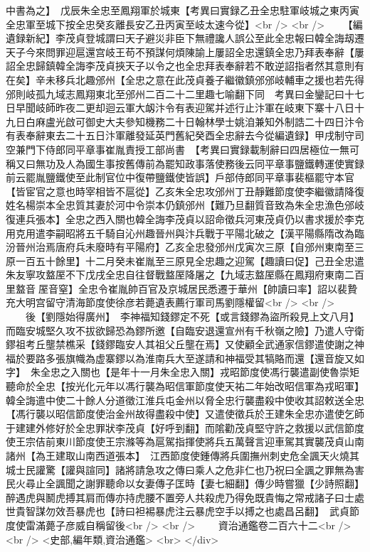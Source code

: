 中書為之】　戊辰朱全忠至鳳翔軍於城東【考異曰實録乙丑全忠駐軍岐城之東丙寅全忠軍至城下按全忠癸亥離長安乙丑丙寅至岐太速今從】<br />
<br />
　　【編遺録新紀】李茂貞登城謂曰天子避災非臣下無禮讒人誤公至此全忠報曰韓全誨刼遷天子今來問罪迎扈還宫岐王苟不預謀何煩陳諭上屢詔全忠還鎮全忠乃拜表奉辭【屢詔全忠歸鎮韓全誨李茂貞挾天子以令之也全忠拜表奉辭若不敢逆詔指者然其意則有在矣】辛未移兵北趣邠州【全忠之意在此茂貞養子繼徽鎮邠邠岐輔車之援也若先得邠則岐孤九域志鳳翔東北至邠州二百二十二里趣七喻翻下同　考異曰金鑾記曰十七日早聞岐師昨夜二更却迴云軍大衂汴令有表迎駕并述行止汴軍在岐東下寨十八日十九日白麻盧光啟可御史大夫參知機務二十日翰林學士姚洎兼知外制誥二十四日汴令有表奉辭東去二十五日汴軍離發延英門舊紀癸酉全忠辭去今從編遺録】甲戌制守司空兼門下侍郎同平章事崔胤責授工部尚書　【考異曰實録載制辭曰四居極位一無可稱又曰無功及人為國生事按舊傳前為罷知政事落使務後云同平章事鹽鐵轉運使實録前云罷胤鹽鐵使至此制官位中復帶鹽鐵使皆誤】戶部侍郎同平章事裴樞罷守本官【皆宦官之意也時宰相皆不扈從】乙亥朱全忠攻邠州丁丑靜難節度使李繼徽請降復姓名楊崇本全忠質其妻於河中令崇本仍鎮邠州【難乃旦翻質音致為朱全忠漁色邠岐復連兵張本】全忠之西入關也韓全誨李茂貞以詔命徵兵河東茂貞仍以書求援於李克用克用遣李嗣昭將五千騎自沁州趣晉州與汴兵戰于平陽北破之【漢平陽縣隋改為臨汾晉州治焉唐府兵未廢時有平陽府】乙亥全忠發邠州戊寅次三原【自邠州東南至三原一百五十餘里】十二月癸未崔胤至三原見全忠趣之迎駕【趣讀曰促】己丑全忠遣朱友寧攻盩厔不下戊戌全忠自往督戰盩厔降屠之【九域志盩厔縣在鳳翔府東南二百里盩音厔音窒】全忠令崔胤帥百官及京城居民悉遷于華州【帥讀曰率】詔以裴贄充大明宫留守清海節度使徐彦若薨遺表薦行軍司馬劉隱權留<br />
<br />
　　後【劉隱始得廣州】　李神福知錢鏐定不死【或言錢鏐為盜所殺見上文八月】而臨安城堅久攻不拔欲歸恐為鏐所邀【自臨安退還宣州有千秋嶺之險】乃遣人守衛鏐祖考丘壟禁樵采【錢鏐臨安人其祖父丘壟在焉】又使顧全武通家信鏐遣使謝之神福於要路多張旗幟為虚寨鏐以為淮南兵大至遂請和神福受其犒賂而還【還音旋又如字】　朱全忠之入關也【是年十一月朱全忠入關】戎昭節度使馮行襲遣副使魯崇矩聽命於全忠【按光化元年以馮行襲為昭信軍節度使天祐二年始改昭信軍為戎昭軍】韓全誨遣中使二十餘人分道徵江淮兵屯金州以脅全忠行襲盡殺中使收其詔敕送全忠【馮行襲以昭信節度使治金州故得盡殺中使】又遣使徵兵於王建朱全忠亦遣使乞師于建建外修好於全忠罪狀李茂貞【好呼到翻】而隂勸茂貞堅守許之救援以武信節度使王宗佶前東川節度使王宗滌等為扈駕指揮使將兵五萬聲言迎車駕其實襲茂貞山南諸州【為王建取山南西道張本】　江西節度使鍾傳將兵圍撫州刺史危全諷天火燒其城士民讙驚【讙與諠同】諸將請急攻之傳曰乘人之危非仁也乃祝曰全諷之罪無為害民火尋止全諷聞之謝罪聽命以女妻傳子匡時【妻七細翻】傳少時嘗獵【少詩照翻】醉遇虎與鬭虎搏其肩而傳亦持虎腰不置旁人共殺虎乃得免既貴悔之常戒諸子曰士處世貴智謀勿效吾暴虎也【詩曰袒裼暴虎注云暴虎空手以搏之也處昌呂翻】　武貞節度使雷滿薨子彦威自稱留後<br />
<br />
　　資治通鑑卷二百六十二<br />
<br />
<史部,編年類,資治通鑑>  <br>
   </div> 

